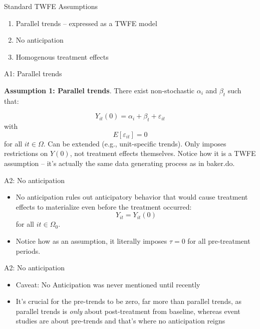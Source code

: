 \documentclass{beamer}
\begin{document}
\begin{frame}{Standard TWFE Assumptions}

\begin{enumerate}
\item Parallel trends -- expressed as a TWFE model
\item No anticipation
\item Homogenous treatment effects
\end{enumerate}

\end{frame}

\begin{frame}{A1: Parallel trends}

\textbf{Assumption 1: Parallel trends}. There exist non-stochastic $\alpha_i$ and $\beta_t$ such that:

$$Y_{it}(0) = \alpha_i + \beta_t + \varepsilon_{it}$$with $$E[\varepsilon_{it}]=0$$for all $it \in \Omega$. Can be extended (e.g., unit-specific trends). Only imposes restrictions on $Y(0)$, not treatment effects themselves. Notice how it is a TWFE assumption -- it's actually the same data generating process as in baker.do.

\end{frame}

\begin{frame}{A2: No anticipation}

\begin{itemize}
\item No anticipation rules out anticipatory behavior that would cause treatment effects to materialize even before the treatment occurred:$$Y_{it} = Y_{it}(0)$$ for all $it \in \Omega_0$. 
\item Notice how as an assumption, it literally imposes $\tau=0$ for all pre-treatment periods. 

\end{itemize}

\end{frame}

\begin{frame}{A2: No anticipation}

\begin{itemize}
\item Caveat: No Anticipation was never mentioned until recently
\item It's crucial for the pre-trends to be zero, far more than parallel trends, as parallel trends is \emph{only} about post-treatment from baseline, whereas event studies are about pre-trends and that's where no anticipation reigns
\end{itemize}

\end{frame}
\end{document}
